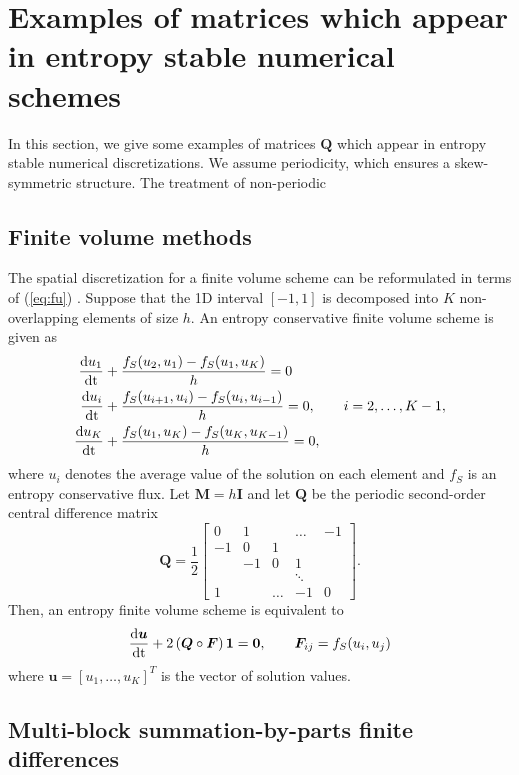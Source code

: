 \documentclass{article}
\newcommand{\td}[2]{\frac{{\rm d}#1}{{\rm d}{\rm #2}}}
\newcommand{\LRp}[1]{\left( #1 \right)}
\newcommand{\LRs}[1]{\left[ #1 \right]}
\newcommand{\eq}[1]{\begin{align*}#1\end{align*}}
\begin{document}
\section{Examples of matrices which appear in entropy stable numerical schemes}

In this section, we give some examples of matrices $\bm{Q}$ which appear in entropy stable numerical discretizations.  We assume periodicity, which ensures a skew-symmetric structure.  The treatment of non-periodic

\subsection{Finite volume methods}

The spatial discretization for a finite volume scheme can be reformulated in terms of (\ref{eq:fu}) \cite{chan2019entropy}.  Suppose that the 1D interval $[-1,1]$ is decomposed into $K$ non-overlapping elements of size $h$.  An entropy conservative finite volume scheme is given as
\eq{
\td{u_1}{t} &+ \frac{f_S(u_{2},u_1) - f_S(u_1,u_{K})}{h} = 0\\
\td{u_i}{t} &+ \frac{f_S(u_{i+1},u_i) - f_S(u_i,u_{i-1})}{h} = 0, \qquad i = 2,\ldots, K-1,\\
\td{u_K}{t} &+ \frac{f_S(u_{1},u_K) - f_S(u_K,u_{K-1})}{h} = 0,
}
where $u_i$ denotes the average value of the solution on each element and $f_S$ is an entropy conservative flux.  Let $\bm{M} = h\bm{I}$ and let $\bm{Q}$ be the periodic second-order central difference matrix
\[
\bm{Q} = \frac{1}{2}\begin{bmatrix}
0 & 1 & &\ldots & -1\\
-1 & 0 & 1 &&  \\
& -1 & 0 & 1 &  \\
 & & & \ddots &  \\
1 & &\ldots  & -1 & 0
\end{bmatrix}.
\]
Then, an entropy finite volume scheme is equivalent to 
\[
\td{\bm{u}}{t} + 2\LRp{\bm{Q}\circ\bm{F}}\bm{1} = \bm{0}, \qquad \bm{F}_{ij} = f_S(u_i,u_j)
\]
where $\bm{u} = \LRs{u_1,\ldots, u_K}^T$ is the vector of solution values.  

\subsection{Multi-block summation-by-parts finite differences}
\end{document}
